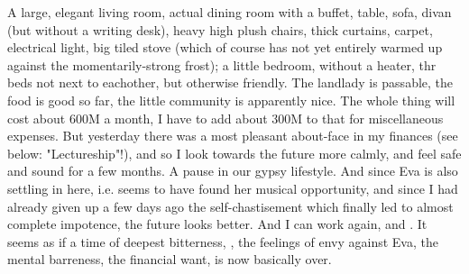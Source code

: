 
A large, elegant living room, actual dining room with a buffet, table, sofa, divan (but without a writing desk), heavy high plush chairs, thick curtains, carpet, electrical light, big tiled stove (which of course has not yet entirely warmed up against the momentarily-strong frost); a little bedroom, without a heater, thr beds not next to eachother, but otherwise friendly. The landlady is passable, the food is good so far, the little community is apparently nice. The whole thing will cost about 600M a month, I have to add about 300M to that for miscellaneous expenses. But yesterday there was a most pleasant about-face in my finances (see below: "Lectureship"!), and so I look towards the future more calmly, and feel safe and sound for a few months. A pause in our gypsy lifestyle. And since Eva is also settling in here, i.e. seems to have found her musical opportunity, and since I had already given up a few days ago the self-chastisement which finally led to almost complete impotence, the future looks better. And I can work again, and . It seems as if a time of deepest bitterness, , the feelings of envy against Eva, the mental barreness, the financial want, is now basically over.

